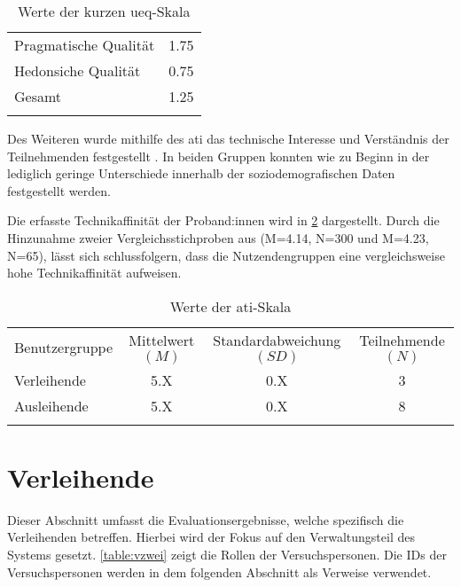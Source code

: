 \begin{table}[h]
  \centering
  \caption{Werte der kurzen \ac{ueq}-Skala}
  \begin{tabular}{lc}
    \arrayrulecolor{maincolor}\hline
    Pragmatische Qualität & 1.75 \\
    Hedonsiche Qualität   & 0.75 \\
    Gesamt                & 1.25 \\
    \arrayrulecolor{maincolor}\hline
  \end{tabular}
  \label{table:ueq}
\end{table}

Des Weiteren wurde mithilfe des \ac{ati} das technische Interesse und Verständnis der Teilnehmenden
festgestellt \cite{attig_assessing_2017}. In beiden Gruppen konnten wie zu Beginn in der
 lediglich geringe Unterschiede innerhalb der soziodemografischen Daten
festgestellt werden.

Die erfasste Technikaffinität der Proband:innen wird in \ref{table:atipartzwei} dargestellt. Durch
die Hinzunahme zweier Vergleichsstichproben aus  (M=4.14, N=300 und
M=4.23, N=65), lässt sich schlussfolgern, dass die Nutzendengruppen eine vergleichsweise hohe
Technikaffinität aufweisen.

\begin{table}[h]
  \centering
  \caption{Werte der \ac{ati}-Skala}
  \begin{tabular}{lccc}
    \arrayrulecolor{maincolor}\hline
    \sffamily\color{maincolor}Benutzergruppe            &
    \sffamily\color{maincolor}Mittelwert $(M)$          &
    \sffamily\color{maincolor}Standardabweichung $(SD)$ &
    \sffamily\color{maincolor}Teilnehmende $(N)$                        \\
    \arrayrulecolor{maincolor}\hline
    Verleihende                                         & 5.X & 0.X & 3 \\
    Ausleihende                                         & 5.X & 0.X & 8 \\
    \arrayrulecolor{maincolor}\hline
  \end{tabular}
  \label{table:atipartzwei}
\end{table}


\section{Verleihende}
Dieser Abschnitt umfasst die Evaluationsergebnisse, welche spezifisch die Verleihenden betreffen.
Hierbei wird der Fokus auf den Verwaltungsteil des Systems gesetzt. \ref{table:vzwei} zeigt die
Rollen der Versuchspersonen. Die IDs der Versuchspersonen werden in dem folgenden
Abschnitt als Verweise verwendet.

